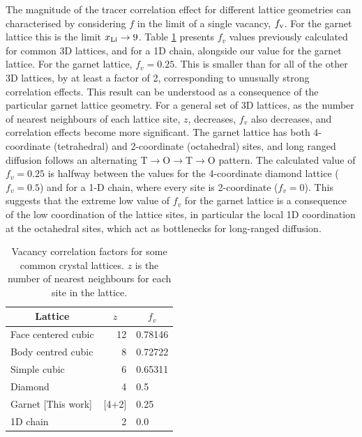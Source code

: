 \documentclass[aps,prb,twocolumn,superscriptaddress,reprint]{revtex4-1}
\newcommand{\xLi}{x_\m{Li}}
\begin{document}
The magnitude of the tracer correlation effect for different lattice geometries can characterised by considering $f$ in the limit of a single vacancy, $f_{\mathrm{v}}$. 
For the garnet lattice this is the limit $\xLi\to9$. 
Table \ref{tab:vacancy_correlation_factors} presents $f_v$ values previously calculated for common 3D lattices,\cite{CompaanAndHaven_TransFaradaySoc1956} and for a 1D chain,\cite{Mehrer_DiffusionBook} alongside our value for the garnet lattice. 
For the garnet lattice, $f_v=0.25$. 
This is smaller than for all of the other 3D lattices, by at least a factor of 2, corresponding to unusually strong correlation effects. 
This result can be understood as a consequence of the particular garnet lattice geometry. 
For a general set of 3D lattices, as the number of nearest neighbours of each lattice site, $z$, decreases, $f_v$ also decreases, and correlation effects become more significant. 
The garnet lattice has both 4-coordinate (tetrahedral) and 2-coordinate (octahedral) sites, and long ranged diffusion follows an alternating T$\to$O$\to$T$\to$O pattern. 
The calculated value of $f_v=0.25$ is halfway between the values for the 4-coordinate diamond lattice ($f_v=0.5$) and for a 1-D chain, where every site is 2-coordinate ($f_v=0$). 
This suggests that the extreme low value of $f_v$ for the garnet lattice is a consequence of the low coordination of the lattice sites, in particular the local 1D coordination at the octahedral sites, which act as bottlenecks for long-ranged diffusion. 

\begin{table}[htb]
   \begin{center}
     \begin{tabular}{lrl} \hline
        \multicolumn{1}{c}{Lattice} & \multicolumn{1}{c}{$z$} & \multicolumn{1}{c}{$f_v$} \\ \hline
        Face centered cubic\cite{CompaanAndHaven_TransFaradaySoc1956} & 12 & 0.78146 \\
        Body centred cubic\cite{CompaanAndHaven_TransFaradaySoc1956} & 8 & 0.72722 \\
        Simple cubic\cite{CompaanAndHaven_TransFaradaySoc1956} & 6 & 0.65311 \\
        Diamond\cite{CompaanAndHaven_TransFaradaySoc1956} & 4 & 0.5 \\
        Garnet [This work] & [4+2] & 0.25 \\ 
        1D chain\cite{Mehrer_DiffusionBook} & 2 & 0.0 \\ \hline
     \end{tabular}
   \caption{\label{tab:vacancy_correlation_factors}Vacancy correlation factors for some common crystal lattices. $z$ is the number of nearest neighbours for each site in the lattice.}
   \end{center}
 \end{table}
\end{document}
